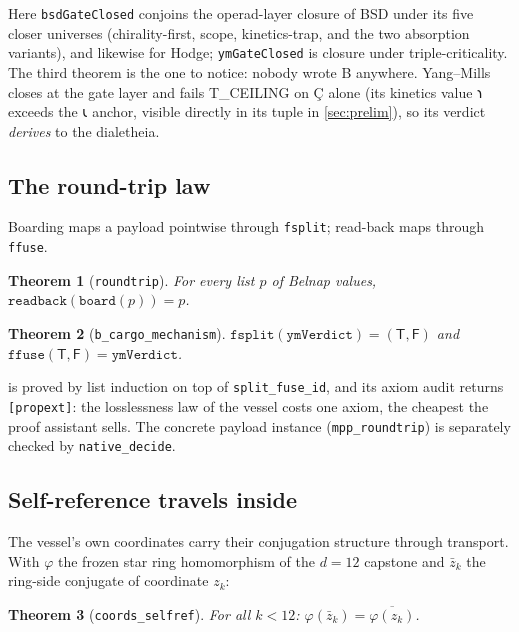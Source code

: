 \documentclass[12pt,a4paper]{article}
\newtheorem{theorem}{Theorem}[section]
\newcommand{\igp}[1]{{\igprimfont #1}}
\newcommand{\shav}[1]{{\shavfont #1}}
\newcommand{\bT}{\textsf{T}}
\newcommand{\bF}{\textsf{F}}
\newcommand{\bB}{\textsf{B}}
\begin{document}
Here \texttt{bsdGateClosed} conjoins the operad-layer closure of BSD under
its five closer universes (chirality-first, scope, kinetics-trap, and the
two absorption variants), and likewise for Hodge; \texttt{ymGateClosed} is
closure under triple-criticality. The third theorem is the one to notice:
nobody wrote \bB{} anywhere. Yang--Mills closes at the gate layer and
fails T\_CEILING on \igp{Ç} alone (its kinetics value \shav{𐑪} exceeds the
\shav{𐑧} anchor, visible directly in its tuple in \cref{sec:prelim}), so
its verdict \emph{derives} to the dialetheia.

\subsection{The round-trip law}

Boarding maps a payload pointwise through \texttt{fsplit}; read-back maps
through \texttt{ffuse}.

\begin{theorem}[\texttt{roundtrip}]
\label{thm:roundtrip}
For every list $p$ of Belnap values,
$\texttt{readback}(\texttt{board}(p)) = p$.
\end{theorem}

\begin{theorem}[\texttt{b\_cargo\_mechanism}]
$\texttt{fsplit}(\texttt{ymVerdict}) = (\bT, \bF)$ and
$\texttt{ffuse}(\bT, \bF) = \texttt{ymVerdict}$.
\end{theorem}

 is proved by list induction on top of
\texttt{split\_fuse\_id}, and its axiom audit returns
\texttt{[propext]}: the losslessness law of the vessel costs one axiom,
the cheapest the proof assistant sells. The concrete payload instance
(\texttt{mpp\_roundtrip}) is separately checked by \texttt{native\_decide}.

\subsection{Self-reference travels inside}

The vessel's own coordinates carry their conjugation structure through
transport. With $\varphi$ the frozen star ring homomorphism of the $d=12$
capstone and $\bar{z}_k$ the ring-side conjugate of coordinate $z_k$:

\begin{theorem}[\texttt{coords\_selfref}]
For all $k < 12$: $\varphi(\bar{z}_k) = \overline{\varphi(z_k)}$.
\end{theorem}
\end{document}
